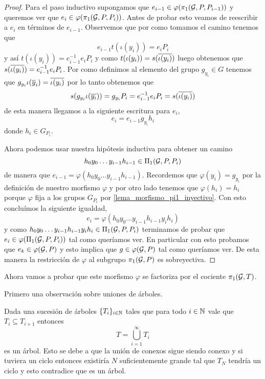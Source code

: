 \documentclass[tesis.tex]{subfiles}
\begin{document}
\begin{proof}
	Para el paso inductivo supongamos que $e_{i-1} \in \varphi(\pi_1({\cal G}, P, P_{i-1}))$ y queremos ver que $e_i \in \varphi(\pi_1({\cal G}, P, P_{i}))$.
	Antes de probar esto veamos de reescribir a $e_i$ en términos de $e_{i-1}$.
	Observemos que por como tomamos el camino tenemos que
	\[
		e_{i-1} t(\iota (y_i)) = e_i P_i 
	\]
	y así $t(\iota (y_i)) = e_{i-1}^{-1} e_i P_i$ y como $t(\iota (y_i)) = s(\overline{\iota(y_i)})$ luego obtenemos que $s(\overline{\iota(y_i)}) = e_{i-1}^{-1} e_i P_i$.
	Por como definimos al elemento del grupo $g_{y_i} \in G$ tenemos que $g_{y_i} \iota (\overline y_i) = \overline{\iota (y_i)}$ por lo tanto obtenemos que 
	\[
		s(g_{y_i} \iota (\overline{y_i})) = g_{y_i} P_i = e_{i-1}^{-1} e_i P_i = s(\overline{\iota (y_i)})
	\]
	de esta manera llegamos a la siguiente escritura para $e_i$,
	\begin{equation*}
		e_i  = e_{i-1}g_{y_i} h_i 
	\end{equation*}
	donde $h_i \in G_{P_i}$. 
	
	Ahora podemos usar nuestra hipótesis inductiva para obtener un camino 
	\[
		h_0y_0 \dots y_{i-1}h_{i-1} \in \Pi_1({\cal G}, P, P_i)
	\]
	de manera que $e_{i-1} =  \varphi(h_0y_0 \dots y_{i-1}h_{i-1})$. 
	Recordemos que $\varphi(y_i) = g_{y_i}$ por la definición de nuestro morfismo $\varphi$ y por otro lado tenemos que $\varphi(h_i) = h_i$ porque $\varphi$ fija a los grupos $G_{P_i}$ por \ref{lema_morfismo_pi1_inyectivo}.
	Con esto concluímos la siguiente igualdad,
	\[
		e_i = \varphi(h_0y_0 \dots y_{i-1}h_{i-1} y_i h_i)
	\]
	y como $h_0y_0 \dots y_{i-1}h_{i-1} y_i h_i \in \Pi_1({\cal G}, P, P_i)$ terminamos de probar que $e_{i} \in \varphi(\Pi_1({\cal G}, P, P_i))$ tal como queríamos ver. 
	En particular con esto probamos que $e_k \in \varphi({\cal G}, P)$ y esto implica que $g \in \varphi({\cal G}, P)$ tal como queríamos ver.
	De esta manera la restricción de $\varphi$ al subgrupo $\pi_1({\cal G}, P)$ es sobreyectiva.
\end{proof}

Ahora vamos a probar que este morfismo $\varphi$ se factoriza por el cociente $\pi_1({\cal G}, T)$.

Primero una observación sobre uniones de árboles.
\begin{obs}\label{lema_union_arboles}
	Dada una sucesión de árboles $\{T_{i}\}_{i\in \mathbb{N}}$ tales que para todo $i \in \mathbb{N}$ vale que $T_{i} \subseteq T_{i+1}$ entonces 
	\[
	T = \bigcup_{i=1}^{\infty} T_{i}
	\]
	es un árbol.
	Esto se debe a que la unión de conexos sigue siendo conexo y si tuviera un ciclo entonces existiría $N$ suficientemente grande tal que $T_{N}$ tendría un ciclo y esto contradice que es un árbol.
\end{obs}
\end{document}
